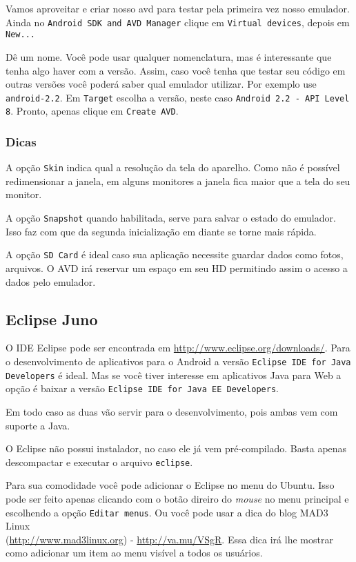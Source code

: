 Vamos aproveitar e criar nosso \gls{avd} para testar pela primeira vez nosso emulador. Ainda no
\texttt{Android SDK and AVD Manager} clique em \texttt{Virtual devices}, depois em \texttt{New...}

Dê um nome. Você pode usar qualquer nomenclatura, mas é interessante que tenha algo haver com a versão. Assim,
caso você tenha que testar seu código em outras versões você poderá saber qual emulador utilizar. Por
exemplo use \texttt{android-2.2}. Em \texttt{Target} escolha a versão, neste caso
\texttt{Android 2.2 - API Level 8}. Pronto, apenas clique em \texttt{Create AVD}.

\subsubsection{Dicas}

A opção \texttt{Skin} indica qual a resolução da tela do aparelho. Como não é possível
redimensionar a janela, em alguns monitores a janela fica maior que a tela do seu monitor.

A opção \texttt{Snapshot} quando habilitada, serve para salvar o estado do emulador. Isso faz
com que da segunda inicialização em diante se torne mais rápida.

A opção \texttt{SD Card} é ideal caso sua aplicação necessite guardar dados como fotos, arquivos.
O AVD irá reservar um espaço em seu HD permitindo assim o acesso a dados pelo emulador.

\subsection{Eclipse Juno}

O IDE Eclipse pode ser encontrada em \url{http://www.eclipse.org/downloads/}. Para o desenvolvimento
de aplicativos para o Android a versão \texttt{Eclipse IDE for Java Developers} é ideal. Mas se você
tiver interesse em aplicativos Java para Web a opção é baixar a versão \texttt{Eclipse IDE for Java EE Developers}.

Em todo caso as duas vão servir para o desenvolvimento, pois ambas vem com suporte a Java.

O Eclipse não possui instalador, no caso ele já vem pré-compilado. Basta apenas descompactar e executar
o arquivo \texttt{eclipse}.

Para sua comodidade você pode adicionar o Eclipse no menu do Ubuntu. Isso pode ser feito apenas clicando
com o botão direiro do \textit{mouse} no menu principal e escolhendo a opção \texttt{Editar menus}. Ou você pode
usar a dica do blog MAD3 Linux \\ (\url{http://www.mad3linux.org}) - \url{http://va.mu/VSgR}. Essa dica irá
lhe mostrar como adicionar um item ao menu visível a todos os usuários.

